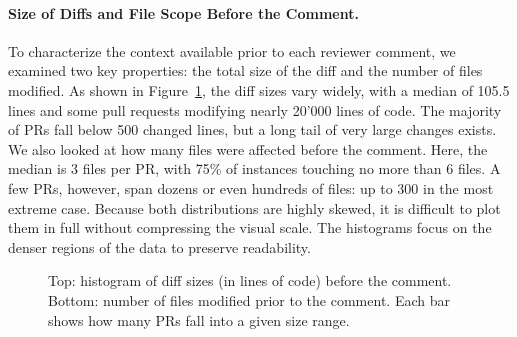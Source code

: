 \paragraph{Size of Diffs and File Scope Before the Comment.}
To characterize the context available prior to each reviewer comment, we examined two key
properties: the total size of the diff and the number of files modified. As shown in
Figure~\ref{fig:diff-before}, the diff sizes vary widely, with a median of 105.5 lines and some pull
requests modifying nearly 20'000 lines of code. The majority of PRs fall below 500 changed lines,
but a long tail of very large changes exists. We also looked at how many files were affected before
the comment. Here, the median is 3 files per PR, with 75\% of instances touching no more than 6
files. A few PRs, however, span dozens or even hundreds of files: up to 300 in the most extreme
case. Because both distributions are highly skewed, it is difficult to plot them in full without
compressing the visual scale. The histograms focus on the denser regions of the data to preserve
readability.

\begin{figure}[ht]
	\centering

	\vspace{1em}


	\caption{Top: histogram of diff sizes (in lines of code) before the comment. Bottom: number of files modified prior to the comment. Each bar shows how many PRs fall into a given size range.}
	\label{fig:diff-before}
\end{figure}

